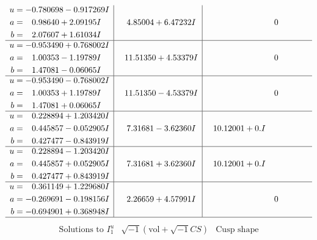 \documentclass[1p]{elsarticle_modified}
\theoremstyle{definition}
\newcommand{\I}{\sqrt{-1}}
\begin{document}
$$\begin{array}{c|c|c}
\begin{aligned}
u &= -0.780698 - 0.917269 I \\
a &= \phantom{-}0.98640 + 2.09195 I \\
b &= \phantom{-}2.07607 + 1.61034 I\end{aligned}
 & \phantom{-}4.85004 + 6.47232 I & \phantom{-0.000000 } 0 \\ \hline\begin{aligned}
u &= -0.953490 + 0.768002 I \\
a &= \phantom{-}1.00353 - 1.19789 I \\
b &= \phantom{-}1.47081 - 0.06065 I\end{aligned}
 & \phantom{-}11.51350 + 4.53379 I & \phantom{-0.000000 } 0 \\ \hline\begin{aligned}
u &= -0.953490 - 0.768002 I \\
a &= \phantom{-}1.00353 + 1.19789 I \\
b &= \phantom{-}1.47081 + 0.06065 I\end{aligned}
 & \phantom{-}11.51350 - 4.53379 I & \phantom{-0.000000 } 0 \\ \hline\begin{aligned}
u &= \phantom{-}0.228894 + 1.203420 I \\
a &= \phantom{-}0.445857 - 0.052905 I \\
b &= \phantom{-}0.427477 - 0.843919 I\end{aligned}
 & \phantom{-}7.31681 - 3.62360 I & \phantom{-}10.12001 + 0. I\phantom{ +0.000000I} \\ \hline\begin{aligned}
u &= \phantom{-}0.228894 - 1.203420 I \\
a &= \phantom{-}0.445857 + 0.052905 I \\
b &= \phantom{-}0.427477 + 0.843919 I\end{aligned}
 & \phantom{-}7.31681 + 3.62360 I & \phantom{-}10.12001 + 0. I\phantom{ +0.000000I} \\ \hline\begin{aligned}
u &= \phantom{-}0.361149 + 1.229680 I \\
a &= -0.269691 - 0.198156 I \\
b &= -0.694901 + 0.368948 I\end{aligned}
 & \phantom{-}2.26659 + 4.57991 I & \phantom{-0.000000 } 0\\
 \hline 
 \end{array}$$\newpage$$\begin{array}{c|c|c}  
\text{Solutions to }I^u_{1}& \I (\text{vol} + \sqrt{-1}CS) & \text{Cusp shape}\\

\end{array}$$
\end{document}

